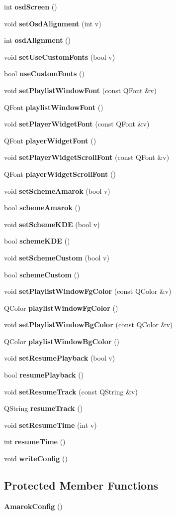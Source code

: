 \begin{CompactItemize}
int {\bf osd\-Screen} ()
\item 
void {\bf set\-Osd\-Alignment} (int v)
\item 
int {\bf osd\-Alignment} ()
\item 
void {\bf set\-Use\-Custom\-Fonts} (bool v)
\item 
bool {\bf use\-Custom\-Fonts} ()
\item 
void {\bf set\-Playlist\-Window\-Font} (const QFont \&v)
\item 
QFont {\bf playlist\-Window\-Font} ()
\item 
void {\bf set\-Player\-Widget\-Font} (const QFont \&v)
\item 
QFont {\bf player\-Widget\-Font} ()
\item 
void {\bf set\-Player\-Widget\-Scroll\-Font} (const QFont \&v)
\item 
QFont {\bf player\-Widget\-Scroll\-Font} ()
\item 
void {\bf set\-Scheme\-Amarok} (bool v)
\item 
bool {\bf scheme\-Amarok} ()
\item 
void {\bf set\-Scheme\-KDE} (bool v)
\item 
bool {\bf scheme\-KDE} ()
\item 
void {\bf set\-Scheme\-Custom} (bool v)
\item 
bool {\bf scheme\-Custom} ()
\item 
void {\bf set\-Playlist\-Window\-Fg\-Color} (const QColor \&v)
\item 
QColor {\bf playlist\-Window\-Fg\-Color} ()
\item 
void {\bf set\-Playlist\-Window\-Bg\-Color} (const QColor \&v)
\item 
QColor {\bf playlist\-Window\-Bg\-Color} ()
\item 
void {\bf set\-Resume\-Playback} (bool v)
\item 
bool {\bf resume\-Playback} ()
\item 
void {\bf set\-Resume\-Track} (const QString \&v)
\item 
QString {\bf resume\-Track} ()
\item 
void {\bf set\-Resume\-Time} (int v)
\item 
int {\bf resume\-Time} ()
\item 
void {\bf write\-Config} ()
\end{CompactItemize}
\subsection*{Protected Member Functions}
\begin{CompactItemize}
\item 
{\bf Amarok\-Config} ()
\end{CompactItemize}
